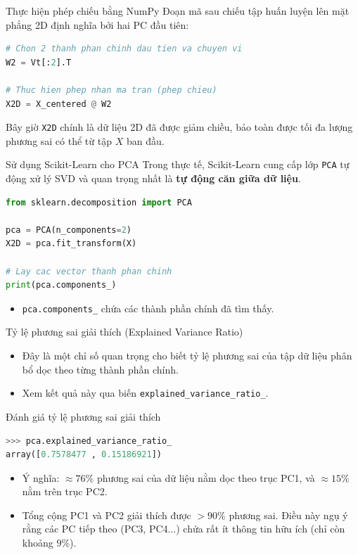 \documentclass[aspectratio=169]{beamer}
\begin{document}
\begin{frame}[fragile]{Thực hiện phép chiếu bằng NumPy}
    Đoạn mã sau chiếu tập huấn luyện lên mặt phẳng 2D định nghĩa bởi hai PC đầu tiên:
    \begin{lstlisting}[language=Python]
# Chon 2 thanh phan chinh dau tien va chuyen vi
W2 = Vt[:2].T

# Thuc hien phep nhan ma tran (phep chieu)
X2D = X_centered @ W2
    \end{lstlisting}
    Bây giờ \texttt{X2D} chính là dữ liệu 2D đã được giảm chiều, bảo toàn được tối đa lượng phương sai có thể từ tập $X$ ban đầu.
\end{frame}

\begin{frame}[fragile]{Sử dụng Scikit-Learn cho PCA}
    Trong thực tế, Scikit-Learn cung cấp lớp \texttt{PCA} tự động xử lý SVD và quan trọng nhất là \textbf{tự động căn giữa dữ liệu}.
    \begin{lstlisting}[language=Python]
from sklearn.decomposition import PCA

pca = PCA(n_components=2)
X2D = pca.fit_transform(X)

# Lay cac vector thanh phan chinh
print(pca.components_)
    \end{lstlisting}
    \begin{itemize}
        \item \texttt{pca.components\_} chứa các thành phần chính đã tìm thấy.
    \end{itemize}
\end{frame}

\begin{frame}{Tỷ lệ phương sai giải thích (Explained Variance Ratio)}
    \begin{itemize}
        \item Đây là một chỉ số quan trọng cho biết tỷ lệ phương sai của tập dữ liệu phân bổ dọc theo từng thành phần chính.
        \item Xem kết quả này qua biến \texttt{explained\_variance\_ratio\_}.
    \end{itemize}
\end{frame}

\begin{frame}[fragile]{Đánh giá tỷ lệ phương sai giải thích}
    \begin{lstlisting}[language=Python]
>>> pca.explained_variance_ratio_
array([0.7578477 , 0.15186921])
    \end{lstlisting}
    \begin{itemize}
        \item Ý nghĩa: $\approx 76\%$ phương sai của dữ liệu nằm dọc theo trục PC1, và $\approx 15\%$ nằm trên trục PC2.
        \item Tổng cộng PC1 và PC2 giải thích được $>90\%$ phương sai. Điều này ngụ ý rằng các PC tiếp theo (PC3, PC4...) chứa rất ít thông tin hữu ích (chỉ còn khoảng $9\%$).
    \end{itemize}
\end{frame}
\end{document}
